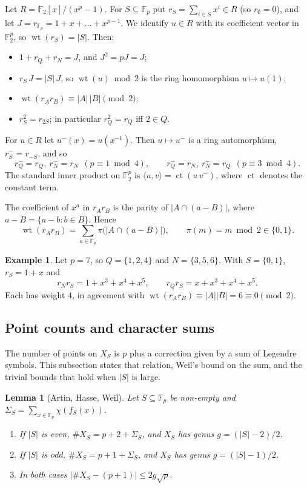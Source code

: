 \documentclass[12pt,letterpaper]{article}
\newtheorem{lemma}[theorem]{Lemma}
\theoremstyle{definition}
\newtheorem{example}[theorem]{Example}
\theoremstyle{remark}
\numberwithin{equation}{section}
\newcommand{\F}{\mathbb{F}}
\newcommand{\Fp}{\mathbb{F}_p}
\newcommand{\wt}{\operatorname{wt}}
\newcommand{\ct}{\operatorname{ct}}
\newcommand{\X}{\#X}
\begin{document}
Let $R=\F_2[x]/(x^p-1)$. For $S\subseteq\Fp$ put $r_S=\sum_{i\in S}x^i\in R$
(so $r_\emptyset=0$), and let $J=r_{\Fp}=1+x+\dots+x^{p-1}$. We identify $u\in R$
with its coefficient vector in $\F_2^p$, so $\wt(r_S)=|S|$. Then:
\begin{itemize}
\item $1+r_Q+r_N=J$, and $J^2=pJ=J$;
\item $r_S\,J=|S|\,J$, so $\wt(u)\bmod 2$ is the ring homomorphism $u\mapsto u(1)$;
\item $\wt(r_Ar_B)\equiv|A|\,|B|\pmod 2$;
\item $r_S^2=r_{2S}$; in particular $r_Q^2=r_Q$ iff $2\in Q$.
\end{itemize}
For $u\in R$ let $u^-(x)=u(x^{-1})$. Then $u\mapsto u^-$ is a ring automorphism,
$r_S^-=r_{-S}$, and so
\begin{equation}\label{eq:minus}
r_Q^-=r_Q,\ r_N^-=r_N\ \ (p\equiv1\bmod 4),\qquad
r_Q^-=r_N,\ r_N^-=r_Q\ \ (p\equiv3\bmod 4).
\end{equation}
The standard inner product on $\F_2^p$ is
$\langle u,v\rangle=\ct(u\,v^-)$, where $\ct$ denotes the constant term.

The coefficient of $x^a$ in $r_Ar_B$ is the parity of $|A\cap(a-B)|$, where
$a-B=\{a-b:b\in B\}$. Hence
\begin{equation}\label{eq:wtprod}
\wt(r_Ar_B)=\sum_{a\in\Fp}\pi\big(|A\cap(a-B)|\big),\qquad
\pi(m)=m\bmod 2\in\{0,1\}.
\end{equation}

\begin{example}\label{ex:p7arith}
Let $p=7$, so $Q=\{1,2,4\}$ and $N=\{3,5,6\}$. With $S=\{0,1\}$, $r_S=1+x$ and
\[
r_Nr_S=1+x^3+x^4+x^5,\qquad r_Qr_S=x+x^3+x^4+x^5 .
\]
Each has weight $4$, in agreement with $\wt(r_Ar_B)\equiv|A||B|=6\equiv0\pmod2$.
\end{example}

\subsection{Point counts and character sums}
The number of points on $X_S$ is $p$ plus a correction given by a sum of Legendre
symbols. This subsection states that relation, Weil's bound on the sum, and the
trivial bounds that hold when $|S|$ is large.

\begin{lemma}[Artin, Hasse, Weil]\label{lem:AHW}
Let $S\subseteq\Fp$ be non-empty and $\Sigma_S=\sum_{x\in\Fp}\chi(f_S(x))$.
\begin{enumerate}
\item If $|S|$ is even, $\X_S=p+2+\Sigma_S$, and $X_S$ has genus $g=(|S|-2)/2$.
\item If $|S|$ is odd, $\X_S=p+1+\Sigma_S$, and $X_S$ has genus $g=(|S|-1)/2$.
\item In both cases $|\X_S-(p+1)|\le 2g\sqrt p$.
\end{enumerate}
\end{lemma}
\end{document}
